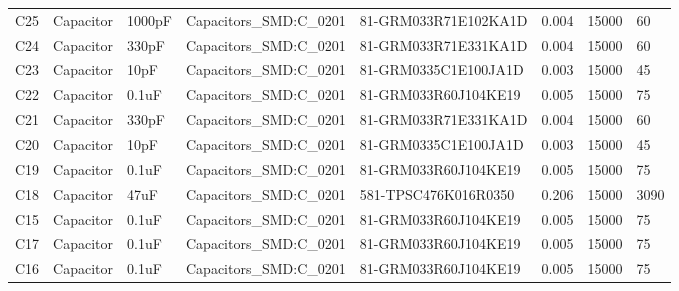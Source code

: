 \begin{landscape}
\begin{table}[]
\begin{tabular}{llllllll}
C25            & Capacitor     & 1000pF                     & Capacitors\_SMD:C\_0201         & 81-GRM033R71E102KA1D                 & 0.004                & 15000           & 60                   \\
C24            & Capacitor     & 330pF                      & Capacitors\_SMD:C\_0201         & 81-GRM033R71E331KA1D                 & 0.004                & 15000           & 60                   \\
C23            & Capacitor     & 10pF                       & Capacitors\_SMD:C\_0201         & 81-GRM0335C1E100JA1D                 & 0.003                & 15000           & 45                   \\
C22            & Capacitor     & 0.1uF                      & Capacitors\_SMD:C\_0201         & 81-GRM033R60J104KE19                 & 0.005                & 15000           & 75                   \\
C21            & Capacitor     & 330pF                      & Capacitors\_SMD:C\_0201         & 81-GRM033R71E331KA1D                 & 0.004                & 15000           & 60                   \\
C20            & Capacitor     & 10pF                       & Capacitors\_SMD:C\_0201         & 81-GRM0335C1E100JA1D                 & 0.003                & 15000           & 45                   \\
C19            & Capacitor     & 0.1uF                      & Capacitors\_SMD:C\_0201         & 81-GRM033R60J104KE19                 & 0.005                & 15000           & 75                   \\
C18            & Capacitor     & 47uF                       & Capacitors\_SMD:C\_0201         & 581-TPSC476K016R0350                 & 0.206                & 15000           & 3090                 \\
C15            & Capacitor     & 0.1uF                      & Capacitors\_SMD:C\_0201         & 81-GRM033R60J104KE19                 & 0.005                & 15000           & 75                   \\
C17            & Capacitor     & 0.1uF                      & Capacitors\_SMD:C\_0201         & 81-GRM033R60J104KE19                 & 0.005                & 15000           & 75                   \\
C16            & Capacitor     & 0.1uF                      & Capacitors\_SMD:C\_0201         & 81-GRM033R60J104KE19                 & 0.005                & 15000           & 75                   \\

\end{tabular}
\end{table}
\end{landscape}
